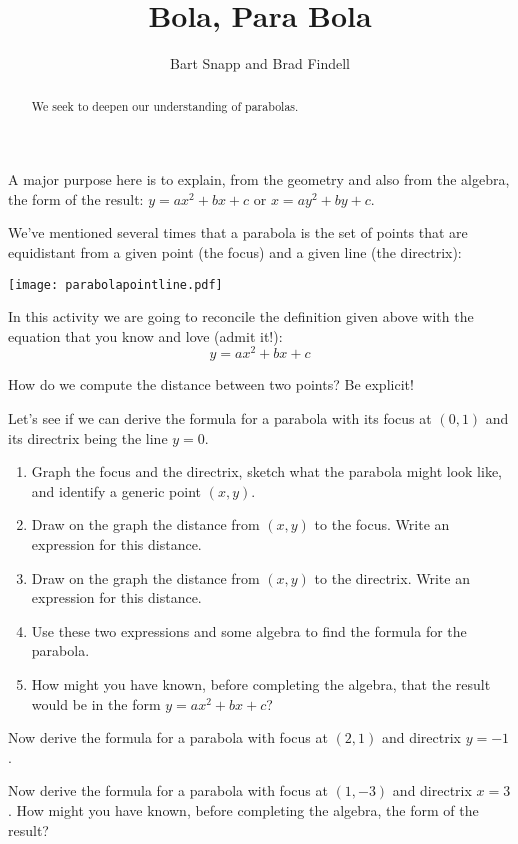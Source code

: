 \documentclass[nooutcomes]{ximera}
\title{Bola, Para Bola}
\author{Bart Snapp and Brad Findell}
\begin{document}
\begin{abstract}
  We seek to deepen our understanding of parabolas.
\end{abstract}
\maketitle

\begin{teachingnote}
A major purpose here is to explain, from the geometry and also from the algebra, the form of the result:
$y = ax^2 + bx + c$ or $x = ay^2 + by + c$.  
\end{teachingnote}
We've mentioned several times that a parabola is the set of points
that are equidistant from a given point (the focus) and a given line
(the directrix):
\begin{image}
\texttt{[image: parabolapointline.pdf]}
\end{image}
In this activity we are going to reconcile the definition given
above with the equation that you know and love (admit it!):
\[
y = ax^2 + bx + c
\]

\begin{problem}
How do we compute the distance between two points? Be explicit!
\end{problem}

\begin{problem}
Let's see if we can derive the formula for a parabola with its focus at $(0,1)$ and its directrix being the line $y=0$.
\begin{enumerate}
\item Graph the focus and the directrix, sketch what the parabola might look like, and identify a generic point $(x, y)$.  
\item Draw on the graph the distance from $(x,y)$ to the focus.  Write an expression for this distance.  
\item Draw on the graph the distance from $(x,y)$ to the directrix.  Write an expression for this distance.  
\item Use these two expressions and some algebra to find the formula for the parabola. 
\vspace{.5in}
\item How might you have known, before completing the algebra, that the result would be in the form 
$y = ax^2 + bx + c$? 
\end{enumerate}
\end{problem}
\vspace{.5in}

\begin{problem}
Now derive the formula for a parabola with focus at $(2,1)$ and directrix $y=-1$.
\end{problem}
\vspace{1in}

\begin{problem}
Now derive the formula for a parabola with focus at $(1,-3)$ and directrix $x=3$.  How might you have known, before completing the algebra, the form of the result?   
\end{problem}
\end{document}
